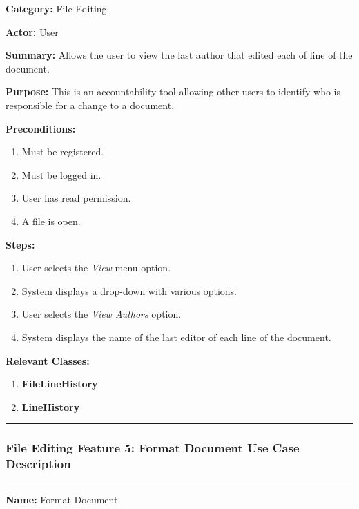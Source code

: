 \documentclass[twoside,letterpaper]{article}
\begin{document}
		\noindent\textbf{Category:} File Editing \newline
		
		\noindent\textbf{Actor:} User \newline
		
		\noindent\textbf{Summary:} Allows the user to view the last author that edited each of line of the document. \newline
		
		\noindent\textbf{Purpose:} This is an accountability tool allowing other users to identify who is responsible for a change to a document. \newline
		
		\noindent\textbf{Preconditions:}
		\begin{enumerate}
			\item Must be registered.
			\item Must be logged in.
			\item User has read permission.
			\item A file is open.
		\end{enumerate}
		\noindent\textbf{Steps:}
		\begin{enumerate}
			\item User selects the \textit{View} menu option.
			\item System displays a drop-down with various options.
			\item User selects the \textit{View Authors} option.
			\item System displays the name of the last editor of each line of the document.
		\end{enumerate}
		\noindent\textbf{Relevant Classes:}
		\begin{enumerate}
			\item \textbf {FileLineHistory}
			\item \textbf {LineHistory}
		\end{enumerate}
	\vspace{8pt}
	\hrule
	\newpage
	
	\subsubsection[File Editing Feature 5: Format Document]{\rmfamily\bfseries\color{black}
		File Editing Feature 5: Format Document Use Case Description}
	\hypertarget{RefHeading22059017292}{}
	
	\vspace{2pt}
	\hrule
	\vspace{8pt}
		\noindent\textbf{Name:} Format Document \newline
		
\end{document}
